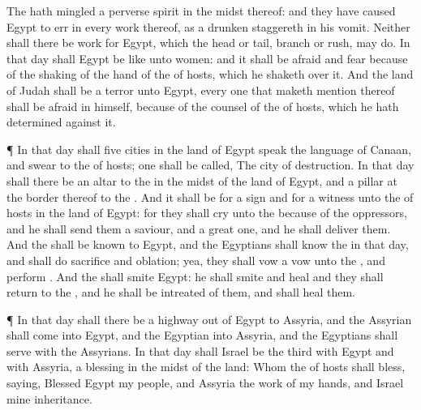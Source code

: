 {The
{} hath
mingled a
perverse
spirit in the
midst thereof: and they have caused
Egypt to
err in every
work thereof, as a
drunken
{}
staggereth in his
vomit.
Neither shall there be
{}
work for
Egypt, which the
head or
tail,
branch or
rush, may
do.
In that
day shall
Egypt be like unto
women: and it shall be
afraid and
fear
because of the
shaking of the
hand of the
{} of
hosts, which he
shaketh over it.
And the
land of
Judah shall be a
terror unto
Egypt, every one that maketh
mention thereof shall be
afraid in himself,
because of the
counsel of the
{} of
hosts, which he hath
determined against it.
\par }{\PP {}¶ In that
day shall
five
cities in the
land of
Egypt
speak the
language of
Canaan, and
swear to the
{} of
hosts;
one shall be
called, The
city of
destruction.
In that
day shall there be an
altar to the
{} in the
midst of the
land of
Egypt, and a
pillar
at the
border thereof to the
{}.
And it shall be for a
sign and for a
witness unto the
{} of
hosts in the
land of
Egypt: for they shall
cry unto the
{}
because of the
oppressors, and he shall
send them a
saviour, and a great
one, and he shall
deliver them.
And the
{} shall be
known to
Egypt, and the
Egyptians shall
know the
{} in that
day, and shall
do
sacrifice and
oblation; yea, they shall
vow a
vow unto the
{}, and
perform
{}.
And the
{} shall
smite
Egypt: he shall
smite and
heal
{} and they shall
return
{} to the
{}, and he shall be
intreated of them, and shall
heal them.
\par }{\PP {}¶ In that
day shall there be a
highway out of
Egypt to
Assyria, and the
Assyrian shall
come into
Egypt, and the
Egyptian into
Assyria, and the
Egyptians shall
serve with the
Assyrians.
In that
day shall
Israel be the
third with
Egypt and with
Assyria,
{} a
blessing in the
midst of the
land:
Whom the
{} of
hosts shall
bless,
saying,
Blessed
{}
Egypt my
people, and
Assyria the
work of my
hands, and
Israel mine
inheritance.

}
